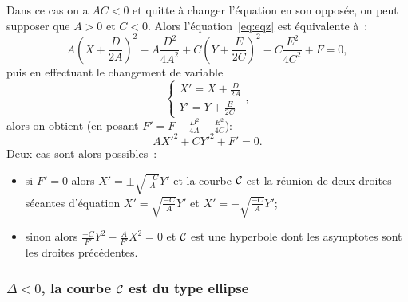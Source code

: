 Dans ce cas on a \(AC < 0\) et quitte à changer l'équation en son opposée, on
peut supposer que \(A > 0\) et \(C < 0\). Alors l'équation~\eqref{eq:eqz} est
équivalente à~:
\begin{equation}
  A\left(X + \frac{D}{2A}\right)^2 - A\frac{D^2}{4A^2} +
  C\left(Y + \frac{E}{2C}\right)^2 - C\frac{E^2}{4C^2} + F = 0,
\end{equation}
puis en effectuant le changement de variable
\begin{equation}
  \begin{cases}
    X' = X + \frac{D}{2A} \\
    Y' = Y + \frac{E}{2C}
  \end{cases},
\end{equation}
alors on obtient (en posant \(F' = F - \frac{D^2}{4A} - \frac{E^2}{4C}\)):
\begin{equation}
  AX'^2 + CY'^2 + F' = 0.
\end{equation}
Deux cas sont alors possibles~:
\begin{itemize}
  \item si \(F' = 0\) alors \(X' = \pm \sqrt{\frac{-C}{A}}Y'\) et la courbe
    \(\mathcal{C}_{{}}\) est la réunion de deux droites sécantes d'équation
    \(X' = \sqrt{\frac{-C}{A}}Y'\) et \(X' = -\sqrt{\frac{-C}{A}}Y'\);
  \item sinon alors \(\frac{-C}{F'}Y^2-\frac{A}{F'}X^2 = 0\) et \(\mathcal{C}_{{}}\) est
    une hyperbole dont les asymptotes sont les droites précédentes.
\end{itemize}

\subsubsection{\(\Delta<0\), la courbe \(\mathcal{C}_{{}}\) est du type ellipse}

